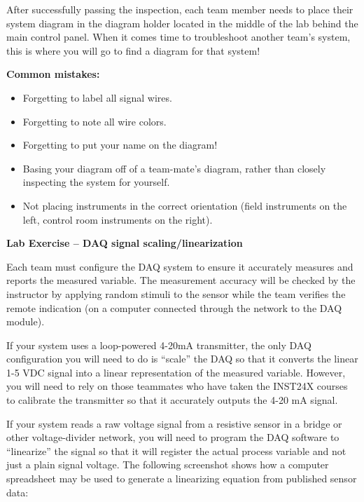 \begin{itemize}
After successfully passing the inspection, each team member needs to place their system diagram in the diagram holder located in the middle of the lab behind the main control panel.  When it comes time to troubleshoot another team's system, this is where you will go to find a diagram for that system!

\vskip 10pt

{\bf Common mistakes:}

\begin{itemize}
\item{} Forgetting to label all signal wires.
\item{} Forgetting to note all wire colors.
\item{} Forgetting to put your name on the diagram!
\item{} Basing your diagram off of a team-mate's diagram, rather than closely inspecting the system for yourself.
\item{} Not placing instruments in the correct orientation (field instruments on the left, control room instruments on the right).
\end{itemize}





\vfil \eject

\noindent
{\bf Lab Exercise -- DAQ signal scaling/linearization}

\vskip 5pt

Each team must configure the DAQ system to ensure it accurately measures and reports the measured variable.  The measurement accuracy will be checked by the instructor by applying random stimuli to the sensor while the team verifies the remote indication (on a computer connected through the network to the DAQ module).

If your system uses a loop-powered 4-20mA transmitter, the only DAQ configuration you will need to do is ``scale'' the DAQ so that it converts the linear 1-5 VDC signal into a linear representation of the measured variable.  However, you will need to rely on those teammates who have taken the INST24X courses to calibrate the transmitter so that it accurately outputs the 4-20 mA signal.

If your system reads a raw voltage signal from a resistive sensor in a bridge or other voltage-divider network, you will need to program the DAQ software to ``linearize'' the signal so that it will register the actual process variable and not just a plain signal voltage.  The following screenshot shows how a computer spreadsheet may be used to generate a linearizing equation from published sensor data:


\end{itemize}
